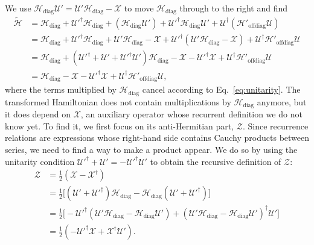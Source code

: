 We use $\mathcal{H}_\textrm{diag} \mathcal{U}' = \mathcal{U}' \mathcal{H}_\textrm{diag} -\mathcal{X}$ to move $\mathcal{H}_\textrm{diag}$ through to the right and find
%
\begin{equation}
\label{eq:H_tilde}
\begin{aligned}
  \tilde{\mathcal{H}}
  &= \mathcal{H}_\textrm{diag} + \mathcal{U}'^\dagger \mathcal{H}_\textrm{diag} + (\mathcal{H}_\textrm{diag} \mathcal{U}') + \mathcal{U}'^\dagger \mathcal{H}_\textrm{diag}
  \mathcal{U}' + \mathcal{U}^\dagger(\mathcal{H}'_\textrm{offdiag}\mathcal{U})
  \\
  &= \mathcal{H}_\textrm{diag} + \mathcal{U}'^\dagger \mathcal{H}_\textrm{diag} + \mathcal{U}'\mathcal{H}_\textrm{diag} - \mathcal{X} + \mathcal{U}'^\dagger (\mathcal{U}' \mathcal{H}_\textrm{diag} - \mathcal{X}) + \mathcal{U}^\dagger\mathcal{H}'_\textrm{offdiag}\mathcal{U} \\
  &= \mathcal{H}_\textrm{diag} + (\mathcal{U}'^\dagger + \mathcal{U}' + \mathcal{U}'^\dagger \mathcal{U}')\mathcal{H}_\textrm{diag} - \mathcal{X} - \mathcal{U}'^\dagger \mathcal{X} + \mathcal{U}^\dagger\mathcal{H}'_\textrm{offdiag}\mathcal{U} \\
  &= \mathcal{H}_\textrm{diag} - \mathcal{X} - \mathcal{U}'^\dagger \mathcal{X} + \mathcal{U}^\dagger\mathcal{H}'_\textrm{offdiag}\mathcal{U},
\end{aligned}
\end{equation}
%
where the terms multiplied by $\mathcal{H}_\textrm{diag}$ cancel according to Eq.~\eqref{eq:unitarity}.
The transformed Hamiltonian does not contain multiplications by $\mathcal{H}_\textrm{diag}$ anymore, but it does depend on $\mathcal{X}$, an auxiliary operator whose recurrent definition we do not know yet.
To find it, we first focus on its anti-Hermitian part, $\mathcal{Z}$.
Since recurrence relations are expressions whose right-hand side contains Cauchy products between series, we need to find a way to make a product appear.
We do so by using the unitarity condition $\mathcal{U}'^\dagger + \mathcal{U}' = -\mathcal{U}'^\dagger \mathcal{U}'$ to obtain the recursive definition of $\mathcal{Z}$:
%
\begin{equation}
\label{eq:Z}
\begin{aligned}
\mathcal{Z}
&= \frac{1}{2} (\mathcal{X} - \mathcal{X}^{\dagger}) \\
&= \frac{1}{2}\Big[ (\mathcal{U}' + \mathcal{U}'^{\dagger}) \mathcal{H}_\textrm{diag} - \mathcal{H}_\textrm{diag} (\mathcal{U}' + \mathcal{U}'^{\dagger}) \Big] \\
&= \frac{1}{2} \Big[ - \mathcal{U}'^{\dagger} (\mathcal{U}'\mathcal{H}_\textrm{diag} - \mathcal{H}_\textrm{diag} \mathcal{U}') + (\mathcal{U}'\mathcal{H}_\textrm{diag} - \mathcal{H}_\textrm{diag} \mathcal{U}')^{\dagger} \mathcal{U}' \Big] \\
&= \frac{1}{2} (-\mathcal{U}'^{\dagger} \mathcal{X} + \mathcal{X}^{\dagger} \mathcal{U}').
\end{aligned}
\end{equation}
